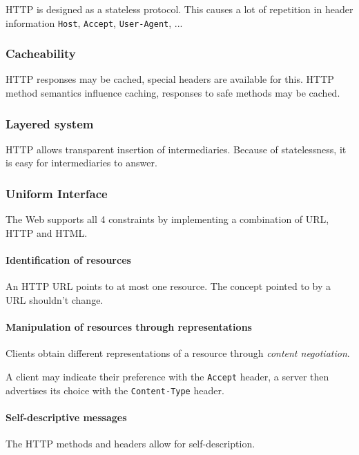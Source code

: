 \documentclass{report}
\begin{document}
HTTP is designed as a stateless protocol.
This causes a lot of repetition in header information
\texttt{Host}, \texttt{Accept}, \texttt{User-Agent}, ...

\subsubsection{Cacheability}

HTTP responses may be cached,
special headers are available for this.
HTTP method semantics influence caching,
responses to safe methods may be cached.

\subsubsection{Layered system}

HTTP allows transparent insertion of intermediaries.
Because of statelessness,
it is easy for intermediaries to answer.

\subsubsection{Uniform Interface}

The Web supports all 4 constraints
by implementing a combination of URL, HTTP and HTML.

\paragraph{Identification of resources}

An HTTP URL points to at most one resource.
The concept pointed to by a URL shouldn't change.

\paragraph{Manipulation of resources through representations}

Clients obtain different representations of a resource
through \emph{content negotiation}.

A client may indicate their preference
with the \texttt{Accept} header,
a server then advertises its choice
with the \texttt{Content-Type} header.

\paragraph{Self-descriptive messages}

The HTTP methods and headers allow for self-description.
\end{document}
